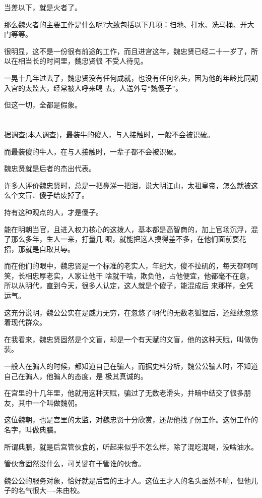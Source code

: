 \documentclass[11pt,a4paper,onecolumn]{article}
\begin{document}
当差以下，就是火者了。

那么魏火者的主要工作是什么呢?大致包括以下几项：扫地、打水、洗马桶、开大门等等。

很明显，这不是一份很有前途的工作，而且进宫这年，魏忠贤已经二十一岁了，所以在相当长的时间里，魏忠贤很
不受人待见。

一晃十几年过去了，魏忠贤没有任何成就，也没有任何名头，因为他的年龄比同期入宫的太监大，经常被人呼来喝
去，人送外号``魏傻子''。

但这一切，全都是假象。

\section[\thesection]{}

据调查(本人调查)，最装牛的傻人，与人接触时，一般不会被识破。

而最装傻的牛人，在与人接触时，一辈子都不会被识破。

魏忠贤就是后者的杰出代表。

许多人评价魏忠贤时，总是一把鼻涕一把泪，说大明江山，太祖皇帝，怎么就被这么个文盲、傻子给废掉了。

持有这种观点的人，才是傻子。

能在明朝当官，且进入权力核心的这拨人，基本都是高智商的，加上官场沉浮，混了那么多年，生人一来，打量几
眼，就能把这人摸得差不多，在他们面前耍花招，那就是自取其辱。

而在他们的眼中，魏忠贤是一个标准的老实人，年纪大，傻不拉矶的，每天都呵呵笑，长相忠厚老实，人家让他干
啥就干啥，欺负他，占他便宜，他都毫不在意，所以从明代，直到今天，很多人认定，这人就是个傻子，能混成后
来那样，全凭运气。

这充分说明，魏公公实在是威力无穷，在忽悠了明代的无数老狐狸后，还继续忽悠着现代群众。

在我看来，魏忠贤固然是个文盲，却是一个有天赋的文盲，他的这种天赋，叫做伪装。

一般人在骗人的时候，都知道自己在骗人，而据史料分析，魏公公骗人时，不知道自己在骗人，他骗人的态度，是
极其真诚的。

在宫里的十几年里，他就用这种天赋，骗过了无数老滑头，并暗中结交了很多朋友，其中一个叫做魏朝。

这位魏朝，也是宫里的太监，对魏忠贤十分欣赏，还帮他找了份工作。这份工作的名字，叫做典膳。

所谓典膳，就是后宫管伙食的，听起来似乎不怎么样，除了混吃混喝，没啥油水。

管伙食固然没什么，可关键在于管谁的伙食。

魏公公的服务对象，恰好就是后宫的王才人。这位王才人的名头虽然不响，但他儿子的名气很大----朱由校。
\end{document}
